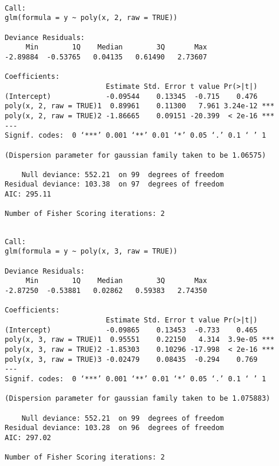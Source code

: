 \documentclass[11pt]{article}
\begin{document}
    
    
    \begin{verbatim}

Call:
glm(formula = y ~ poly(x, 2, raw = TRUE))

Deviance Residuals: 
     Min        1Q    Median        3Q       Max  
-2.89884  -0.53765   0.04135   0.61490   2.73607  

Coefficients:
                        Estimate Std. Error t value Pr(>|t|)    
(Intercept)             -0.09544    0.13345  -0.715    0.476    
poly(x, 2, raw = TRUE)1  0.89961    0.11300   7.961 3.24e-12 ***
poly(x, 2, raw = TRUE)2 -1.86665    0.09151 -20.399  < 2e-16 ***
---
Signif. codes:  0 ‘***’ 0.001 ‘**’ 0.01 ‘*’ 0.05 ‘.’ 0.1 ‘ ’ 1

(Dispersion parameter for gaussian family taken to be 1.06575)

    Null deviance: 552.21  on 99  degrees of freedom
Residual deviance: 103.38  on 97  degrees of freedom
AIC: 295.11

Number of Fisher Scoring iterations: 2

    \end{verbatim}

    
    
    \begin{verbatim}

Call:
glm(formula = y ~ poly(x, 3, raw = TRUE))

Deviance Residuals: 
     Min        1Q    Median        3Q       Max  
-2.87250  -0.53881   0.02862   0.59383   2.74350  

Coefficients:
                        Estimate Std. Error t value Pr(>|t|)    
(Intercept)             -0.09865    0.13453  -0.733    0.465    
poly(x, 3, raw = TRUE)1  0.95551    0.22150   4.314  3.9e-05 ***
poly(x, 3, raw = TRUE)2 -1.85303    0.10296 -17.998  < 2e-16 ***
poly(x, 3, raw = TRUE)3 -0.02479    0.08435  -0.294    0.769    
---
Signif. codes:  0 ‘***’ 0.001 ‘**’ 0.01 ‘*’ 0.05 ‘.’ 0.1 ‘ ’ 1

(Dispersion parameter for gaussian family taken to be 1.075883)

    Null deviance: 552.21  on 99  degrees of freedom
Residual deviance: 103.28  on 96  degrees of freedom
AIC: 297.02

Number of Fisher Scoring iterations: 2

    \end{verbatim}

    
    
\end{document}
